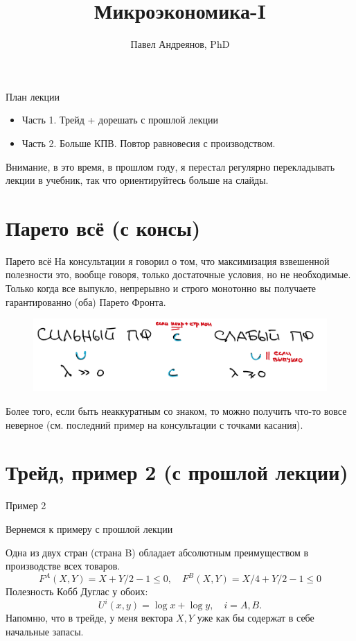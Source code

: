 \documentclass{beamer}
\title{
Микроэкономика-I
}
\author{
Павел Андреянов, PhD
}
\begin{document}
\maketitle

\begin{frame}{План лекции}
\begin{itemize}
  \item Часть 1. Трейд + дорешать с прошлой лекции
  \item Часть 2. Больше КПВ. Повтор равновесия с производством.
\end{itemize}

Внимание, в это время, в прошлом году, я перестал регулярно перекладывать лекции в учебник, так что ориентируйтесь больше на слайды.
\end{frame}

\section{Парето всё (с консы)}
\begin{frame}{Парето всё}
На консультации я говорил о том, что максимизация взвешенной полезности это, вообще говоря, только достаточные условия, но не необходимые. Только когда все выпукло, непрерывно и строго монотонно вы получаете гарантированно (оба) Парето Фронта.
\begin{figure}[hbt]
\centering
\includegraphics[width=1 \textwidth]{pic1.png}
\end{figure}
Более того, если быть неаккуратным со знаком, то можно получить что-то вовсе неверное (см. последний пример на консультации с точками касания).
\end{frame}

\section{Трейд, пример 2 (с прошлой лекции)}

\begin{frame}{Пример 2}

Вернемся к примеру с прошлой лекции

Одна из двух стран (страна B) обладает абсолютным преимуществом в производстве всех товаров.
$$ F^A(X,Y) = X + Y/2 - 1 \leqslant 0, \quad F^B(X,Y) = X/4 + Y/2 - 1 \leqslant 0$$
Полезность Кобб Дуглас у обоих: $$U^i(x,y) = \log x + \log y, \quad i= {A,B}.$$
Напомню, что \alert{в трейде, у меня вектора $X, Y$ уже как бы содержат в себе начальные запасы.}
\end{frame}
\end{document}
